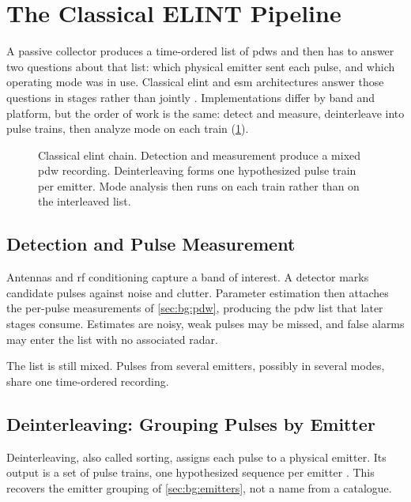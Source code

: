 \section{The Classical ELINT Pipeline}\label{sec:bg:elint_pipeline}

A passive collector produces a time-ordered list of \glspl{pdw} and then has to answer two questions about that list: which physical emitter sent each pulse, and which operating mode was in use.
Classical \gls{elint} and \gls{esm} architectures answer those questions in stages rather than jointly \parencite{wiley2006elint}.
Implementations differ by band and platform, but the order of work is the same: detect and measure, deinterleave into pulse trains, then analyze mode on each train (\cref{fig:bg:classical_pipeline}).

\begin{figure}[H]
\centering

\caption{Classical \gls{elint} chain. Detection and measurement produce a mixed \gls{pdw} recording. Deinterleaving forms one hypothesized pulse train per emitter. Mode analysis then runs on each train rather than on the interleaved list.}
\label{fig:bg:classical_pipeline}
\end{figure}

\subsection*{Detection and Pulse Measurement}

Antennas and \gls{rf} conditioning capture a band of interest.
A detector marks candidate pulses against noise and clutter.
Parameter estimation then attaches the per-pulse measurements of \cref{sec:bg:pdw}, producing the \gls{pdw} list that later stages consume.
Estimates are noisy, weak pulses may be missed, and false alarms may enter the list with no associated radar.

The list is still mixed. Pulses from several emitters, possibly in several modes, share one time-ordered recording.

\subsection{Deinterleaving: Grouping Pulses by Emitter}\label{sec:bg:deinterleaving_evolution}

Deinterleaving, also called sorting, assigns each pulse to a physical emitter.
Its output is a set of pulse trains, one hypothesized sequence per emitter \parencite{wiley2006elint}.
This recovers the emitter grouping of \cref{sec:bg:emitters}, not a name from a catalogue.

